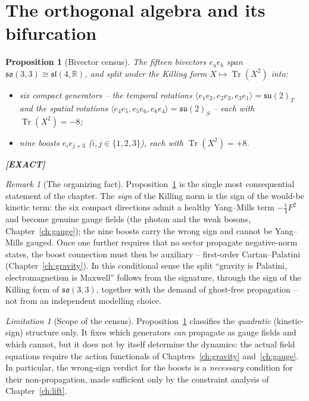 \documentclass[11pt,oneside]{book}
\newcommand{\Tr}{\operatorname{Tr}}
\newcommand{\RR}{\mathbb{R}}
\newcommand{\su}{\mathfrak{su}}
\newcommand{\so}{\mathfrak{so}}
\newcommand{\status}[1]{{\sffamily\bfseries\color{statuscol}[#1]}}
\theoremstyle{plain}
\newtheorem{proposition}[theorem]{Proposition}
\theoremstyle{definition}
\theoremstyle{remark}
\newtheorem{remark}[theorem]{Remark}
\newtheorem{limitation}[theorem]{Limitation}
\begin{document}
\section{The orthogonal algebra and its bifurcation}
\label{sec:so33}

\begin{proposition}[Bivector census]
\label{prop:census}
The fifteen bivectors $e_ae_b$ span $\so(3,3)\cong\mathfrak{sl}(4,\RR)$, and split
under the Killing form $X\mapsto\Tr(X^2)$ into:
\begin{itemize}[itemsep=1pt]
\item six \emph{compact} generators -- the temporal rotations
$\langle e_1e_2,e_2e_3,e_3e_1\rangle=\su(2)_T$ and the spatial rotations
$\langle e_4e_5,e_5e_6,e_6e_4\rangle=\su(2)_S$ -- each with $\Tr(X^2)=-8$;
\item nine \emph{boosts} $e_ie_{j+3}$ ($i,j\in\{1,2,3\}$), each with
$\Tr(X^2)=+8$.
\end{itemize}
\status{EXACT}
\end{proposition}

\begin{remark}[The organizing fact]
Proposition~\ref{prop:census} is the single most consequential statement of the
chapter. The \emph{sign} of the Killing norm is the sign of the would-be kinetic
term: the six compact directions admit a healthy Yang--Mills term $-\tfrac14F^2$
and become genuine gauge fields (the photon and the weak bosons,
Chapter~\ref{ch:gauge}); the nine boosts carry the wrong sign and cannot be
Yang--Mills gauged. Once one further requires that no sector propagate
negative-norm states, the boost connection must then be auxiliary -- first-order
Cartan--Palatini (Chapter~\ref{ch:gravity}). In this conditional sense the split
``gravity is Palatini, electromagnetism is Maxwell'' follows from the signature,
through the sign of the Killing form of $\so(3,3)$, together with the demand of
ghost-free propagation -- not from an independent modelling choice.
\end{remark}

\begin{limitation}[Scope of the census]
\label{lim:census}
Proposition~\ref{prop:census} classifies the \emph{quadratic} (kinetic-sign)
structure only. It fixes which generators \emph{can} propagate as gauge fields and
which cannot, but it does not by itself determine the dynamics: the actual field
equations require the action functionals of Chapters~\ref{ch:gravity}
and~\ref{ch:gauge}. In particular, the wrong-sign verdict for the boosts is a
\emph{necessary} condition for their non-propagation, made sufficient only by the
constraint analysis of Chapter~\ref{ch:lift}.
\end{limitation}
\end{document}
